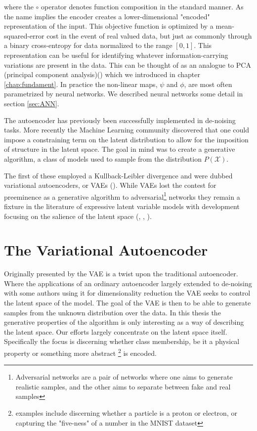 \noindent where the $\circ$ operator denotes function composition in the standard manner. As the name implies the encoder creates a lower-dimensional "encoded" representation of the input. This objective function is optimized by a mean-squared-error cost in the event of real valued data, but just as commonly through a binary cross-entropy for data normalized to the range $[0, 1]$. This representation can be useful for identifying whatever information-carrying variations are present in the data. This can be thought of as an analogue to PCA (principal component analysis)(\cite{Marsland2009}) which we introduced in chapter \ref{chap:fundament}. In practice the non-linear maps, $\psi$ and $\phi$, are most often parametrized by neural networks. We described neural networks some detail in section \ref{sec:ANN}.

The autoencoder has previously been successfully implemented in de-noising tasks.  More recently the Machine Learning community discovered that one could impose a constraining term on the latent distribution to allow for the imposition of structure in the latent space. The goal in mind was to create a generative algorithm, a class of models used to sample from the distribution $P(\mathcal{X})$.

The first of these employed a Kullback-Leibler divergence and were dubbed variational autoencoders, or VAEs (\cite{Kingma2013}). While VAEs lost the contest for preeminence as a generative algorithm to adversarial\footnote{Adversarial networks are a pair of networks where one aims to generate realistic samples, and the other aims to separate between fake and real samples} networks they remain a fixture in the literature of expressive latent variable models with development focusing on the salience of the latent space (\cite{Higgins2017}, \cite{Zhao}, \cite{Fertig}).

\section{The Variational Autoencoder}\label{sec:vae}

Originally presented by \citet{Kingma2013} the VAE is a twist upon the traditional autoencoder. Where the applications of an ordinary autoencoder largely extended to de-noising with some authors using it for dimensionality reduction the VAE seeks to control the latent space of the model. The goal of the VAE is then to be able to generate samples from the unknown distribution over the data. In this thesis the generative properties of the algorithm is only interesting as a way of describing the latent space. Our efforts largely concentrate on the latent space itself. Specifically the focus is discerning whether class membership, be it a physical property or something more abstract \footnote{examples include discerning whether a particle is  a proton or electron, or capturing the "five-ness" of a number in the MNIST dataset} is encoded.

